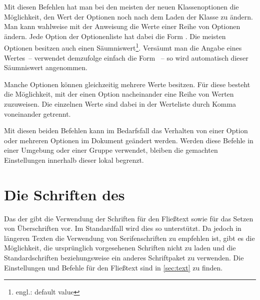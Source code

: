 \begin{Declaration}{}
\begin{Declaration}{}
\printdeclarationlist%
%
%
%
Mit diesen Befehlen hat man bei den meisten der neuen Klassenoptionen die 
Möglichkeit, den Wert der Optionen noch nach dem Laden der Klasse zu ändern.
Man kann wahlweise mit der Anweisung  die Werte einer Reihe 
von Optionen ändern. Jede Option der Optionenliste hat dabei die Form
\PValue{=}. Die meisten Optionen besitzen auch einen 
Säumniswert\footnote{engl.: default value}. Versäumt man die Angabe eines 
Wertes~-- verwendet demzufolge einfach die Form ~-- so wird 
automatisch dieser Säumniswert angenommen.

Manche Optionen können gleichzeitig mehrere Werte besitzen. Für diese besteht 
die Möglichkeit, mit  der einen Option nacheinander eine 
Reihe von Werten zuzuweisen. Die einzelnen Werte sind dabei in der Werteliste 
durch Komma voneinander getrennt.

Mit diesen beiden Befehlen kann im Bedarfsfall das Verhalten von einer Option 
oder mehreren Optionen im Dokument geändert werden. Werden diese Befehle in 
einer Umgebung oder einer Gruppe verwendet, bleiben die gemachten Einstellungen 
innerhalb dieser lokal begrenzt.
\end{Declaration}
\end{Declaration}



\section{Die Schriften des \CDs}
\label{sec:fonts}
%
Das \CD der \TnUD gibt die Verwendung der Schriften \Univers für den Fließtext 
sowie \DIN für das Setzen von Überschriften vor. Im Standardfall wird dies so 
unterstützt. Da jedoch in längeren Texten die Verwendung von Serifenschriften 
zu empfehlen ist, gibt es die Möglichkeit, die ursprünglich vorgesehenen 
Schriften nicht zu laden und die Standardschriften beziehungsweise ein anderes 
Schriftpaket zu verwenden. Die Einstellungen und Befehle für den Fließtext sind 
in \autoref{sec:text} zu finden.

